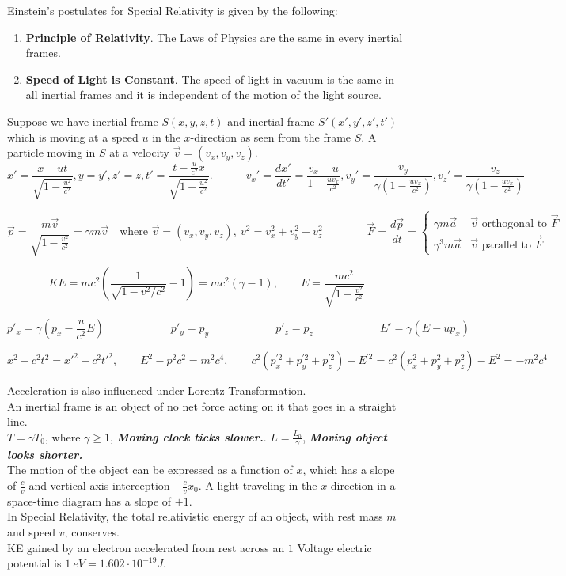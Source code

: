 \documentclass[10pt]{article}
\theoremstyle{break}
\theoremstyle{break}
\newcommand{\ee}{\cdot 10}
\begin{document}
Einstein's postulates for Special Relativity is given by the following:
\begin{enumerate}[topsep=3pt,itemsep=-1ex,partopsep=1ex,parsep=1ex]
\item \textbf{Principle of Relativity}. The Laws of Physics are the same in every inertial frames.
\item \textbf{Speed of Light is Constant}. The speed of light in vacuum is the same in all inertial frames and it is independent of the motion of the light source.
\end{enumerate}

Suppose we have inertial frame $S(x,y,z,t)$ and inertial frame $S'(x',y',z',t')$ which is moving at a speed $u$ in the $x$-direction as seen from the frame $S$. A particle moving in $S$ at a velocity $\vec{v}=(v_x,v_y,v_z)$.  
$$x' = \frac{x-ut}{\sqrt{1-\frac{u^2}{c^2}}}, y=y', z'=z, t'=\frac{t-\frac{u}{c^2}x}{\sqrt{1-\frac{u^2}{c^2}}}. \qquad\quad v_x' = \frac{dx'}{dt'}=\frac{v_x-u}{1-\frac{uv_x}{c^2}}, v_y'=\frac{v_y}{\gamma(1-\frac{uv_x}{c^2})}, v_z' = \frac{v_z}{\gamma(1-\frac{uv_x}{c^2})}$$

$$\vec{p} = \frac{m\vec{v}}{\sqrt{1-\frac{v^2}{c^2}}} = \gamma m\vec{v} \quad \text{where }\vec{v}=(v_x,v_y,v_z),\ v^2 = v_x^2+v_y^2+v_z^2 \qquad\qquad \vec{F} = \frac{d\vec{p}}{dt}= \begin{cases} \gamma m\vec{a} &\vec{v}\text{ orthogonal to }\vec{F} \\ \gamma^3 m\vec{a} &\vec{v}\text{ parallel to }\vec{F}\end{cases}$$

$$KE = mc^2 \left(\frac{1}{\sqrt{1-v^2/c^2}} - 1\right) = mc^2(\gamma-1),\qquad E = \frac{mc^2}{\sqrt{1-\frac{v^2}{c^2}}}$$

$$
p'_x = \gamma \left(p_x-\frac{u}{c^2}E\right)
\qquad \qquad  \qquad
p'_y = p_y \qquad \qquad  \qquad
p'_z = p_z \qquad \qquad  \qquad
E' = \gamma(E-up_x)$$

$$x^2 - c^2 t^2 = x'^2 - c^2 t'^2,\qquad E^2 -p^2c^2 = m^2c^4, \qquad c^2(p_x^{'2}+ p_y^{'2}+p_z^{'2})-E^{'2} = c^2(p_x^{2}+ p_y^{2}+p_z^{2})-E^{2} = -m^2c^4$$

Acceleration is also influenced under Lorentz Transformation.\\
An inertial frame is an object of no net force acting on it that goes in a straight line.\\

$T= \gamma T_0$, where $\gamma \geq 1$, \textbf{\textit{Moving clock ticks slower.}}. $L = \frac{L_0}{\gamma}$, \textbf{\textit{Moving object looks shorter.}}\\
The motion of the object can be expressed as a function of $x$, which has a slope of $\frac{c}{v}$ and vertical axis interception $-\frac{c}{v}x_0$. A light traveling in the $x$ direction in a space-time diagram has a slope of $\pm 1$.\\
In Special Relativity, the total relativistic energy of an object, with rest mass $m$ and speed $v$, conserves.\\
KE gained by an electron accelerated from rest across an $1$ Voltage electric potential is $1\ eV = 1.602\ee^{-19}J$.\\
\end{document}
